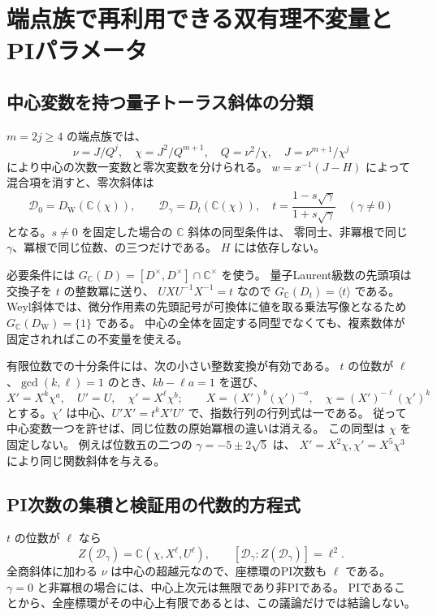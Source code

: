 \section{端点族で再利用できる双有理不変量とPIパラメータ}
\label{sec:notes-endpoint-birational-v38}

\subsection{中心変数を持つ量子トーラス斜体の分類}

$m=2j\ge4$ の端点族では、
\[
 \nu=J/Q^j,\quad \chi=J^2/Q^{m+1},\quad
 Q=\nu^2/\chi,\quad J=\nu^{m+1}/\chi^j
\]
により中心の次数一変数と零次変数を分けられる。
$w=x^{-1}(J-H)$ によって混合項を消すと、零次斜体は
\[
 \mathscr D_0=D_{\mathrm W}(\mathbb C(\chi)),\qquad
 \mathscr D_\gamma=D_t(\mathbb C(\chi)),\quad
 t=\frac{1-s\sqrt\gamma}{1+s\sqrt\gamma}\quad(\gamma\ne0)
\]
となる。$s\ne0$ を固定した場合の $\mathbb C$ 斜体の同型条件は、
零同士、非冪根で同じ $\gamma$、冪根で同じ位数、の三つだけである。
$H$ には依存しない。

必要条件には $G_{\mathbb C}(D)=[D^\times,D^\times]\cap\mathbb C^\times$ を使う。
量子Laurent級数の先頭項は交換子を $t$ の整数冪に送り、
$UXU^{-1}X^{-1}=t$ なので $G_{\mathbb C}(D_t)=\langle t\rangle$ である。
Weyl斜体では、微分作用素の先頭記号が可換体に値を取る乗法写像となるため
$G_{\mathbb C}(D_{\mathrm W})=\{1\}$ である。
中心の全体を固定する同型でなくても、複素数体が固定されればこの不変量を使える。

有限位数での十分条件には、次の小さい整数変換が有効である。
$t$ の位数が $\ell$、$\gcd(k,\ell)=1$ のとき、$kb-\ell a=1$ を選び、
\[
 X'=X^k\chi^a,\quad U'=U,\quad \chi'=X^\ell\chi^b;
 \qquad
 X=(X')^b(\chi')^{-a},\quad \chi=(X')^{-\ell}(\chi')^k
\]
とする。$\chi'$ は中心、$U'X'=t^kX'U'$ で、指数行列の行列式は一である。
従って中心変数一つを許せば、同じ位数の原始冪根の違いは消える。
この同型は $\chi$ を固定しない。
例えば位数五の二つの $\gamma=-5\pm2\sqrt5$ は、
$X'=X^2\chi,\chi'=X^5\chi^3$ により同じ関数斜体を与える。

\subsection{PI次数の集積と検証用の代数的方程式}

$t$ の位数が $\ell$ なら
\[
 Z(\mathscr D_\gamma)=\mathbb C(\chi,X^\ell,U^\ell),\qquad
 [\mathscr D_\gamma:Z(\mathscr D_\gamma)]=\ell^2.
\]
全商斜体に加わる $\nu$ は中心の超越元なので、座標環のPI次数も $\ell$ である。
$\gamma=0$ と非冪根の場合には、中心上次元は無限であり非PIである。
PIであることから、全座標環がその中心上有限であるとは、この議論だけでは結論しない。

